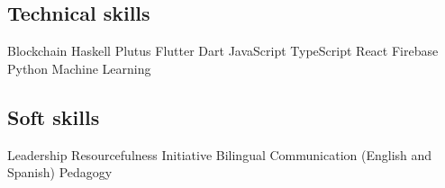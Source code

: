 \documentclass[]{robertino-cv}
\begin{document}
%
%
\begin{minipage}[t]{0.48\textwidth} 


\subsection{Technical skills}
Blockchain \textbullet{}
Haskell \textbullet{}
Plutus \textbullet{}
Flutter \textbullet{}
Dart \textbullet{}
JavaScript \textbullet{}
TypeScript \textbullet{}
React \textbullet{}
Firebase \textbullet{}
Python \textbullet{}
Machine Learning %


%
%

\end{minipage} 
\hfill
\begin{minipage}[t]{0.50\textwidth} 

\subsection{Soft skills}
Leadership \textbullet{}
Resourcefulness \textbullet{}
Initiative \textbullet{}
Bilingual Communication (English and Spanish) \textbullet{}
Pedagogy
\end{minipage} 

\sectionsep
\end{document}
